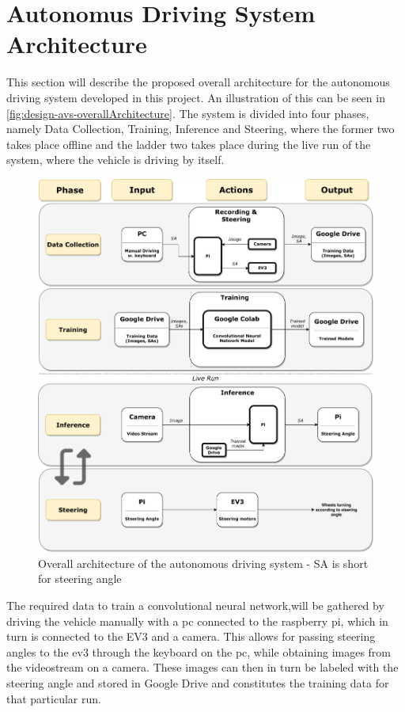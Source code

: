 \section{Autonomus Driving System Architecture}\label{sec:design-avSystemArchitecture}
This section will describe the proposed overall architecture for the autonomous driving system developed in this project.
An illustration of this can be seen in \autoref{fig:design-avs-overallArchitecture}.
The system is divided into four phases, namely Data Collection, Training, Inference and Steering, where the former two takes place offline and the ladder two takes place during the live run of the system, where the vehicle is driving by itself.

\begin{figure}[H]
    \centering
    \includegraphics[width=\textwidth]{images/design/overall-system-architecture.pdf}
    \caption{Overall architecture of the autonomous driving system - SA is short for steering angle}
    \label{fig:design-avs-overallArchitecture}
\end{figure}

The required data to train a convolutional neural network,will be gathered by driving the vehicle manually with a pc connected to the raspberry pi, which in turn is connected to the EV3 and a camera.
This allows for passing steering angles to the ev3 through the keyboard on the pc, while obtaining images from the videostream on a camera.
These images can then in turn be labeled with the steering angle and stored in Google Drive and constitutes the training data for that particular run.

